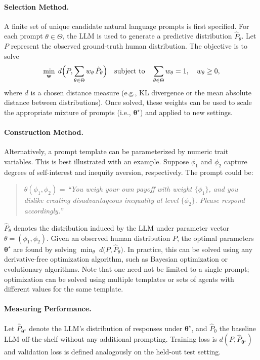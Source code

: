 \documentclass[11pt]{article}
\theoremstyle{definition}
\newcommand{\persona}{prompt}
\begin{document}
\paragraph{Selection Method.}
A finite set of unique candidate natural language \persona{s} is first specified. 
For each \persona{} $\theta \in \Theta$, the LLM is used to generate a predictive distribution $\hat P_\theta$. 
Let $P$ represent the observed ground-truth human distribution.
The objective is to solve
\[
\min_{\mathbf{w}} \; d \Bigl(P, \sum_{\theta \in \Theta} w_\theta \,\hat P_\theta\Bigr) \quad \text{subject to} \quad \sum_{\theta \in \Theta} w_\theta = 1, \quad w_\theta \ge 0,
\]
where $d$ is a chosen distance measure (e.g., KL divergence or the mean absolute distance between distributions). 
Once solved, these weights can be used to scale the appropriate mixture of \persona{s} (i.e., $\bm{\theta^{\star}}$) and applied to new settings.

\paragraph{Construction Method.}
Alternatively, a \persona{} template can be parameterized by numeric trait variables. 
This is best illustrated with an example.
Suppose $\phi_1$ and $\phi_2$ capture degrees of self-interest and inequity aversion, respectively. 
The \persona{} could be:
\begin{quote}
\singlespacing
\vspace{-.5cm}
$\theta(\phi_1, \phi_2)$ = \emph{``You weigh your own payoff with weight $\{\phi_1\}$, and you dislike creating disadvantageous inequality at level $\{\phi_2\}$. Please respond accordingly.''}
\end{quote}
$\hat P_\theta$ denotes the distribution induced by the LLM under parameter vector $\theta = (\phi_1, \phi_2)$. 
Given an observed human distribution $P$, the optimal parameters $\bm{\theta^{\star}}$ are found by solving $\min_{\theta} \; d \bigl(P, \hat P_\theta\bigr)$.
In practice, this can be solved using any derivative-free optimization algorithm, such as Bayesian optimization or evolutionary algorithms.
Note that one need not be limited to a single prompt; optimization can be solved using multiple templates or sets of agents with different values for the same template.

\paragraph{Measuring Performance.}  
Let $\hat P_{\bm{\theta^{\star}}}$ denote the LLM's distribution of responses under $\bm{\theta^{\star}}$, and $\hat P_0$ the baseline LLM off-the-shelf without any additional prompting.
Training loss is $d(P, \hat P_{\bm{\theta^{\star}}})$ and validation loss is defined analogously on the held-out test setting. 
\end{document}
